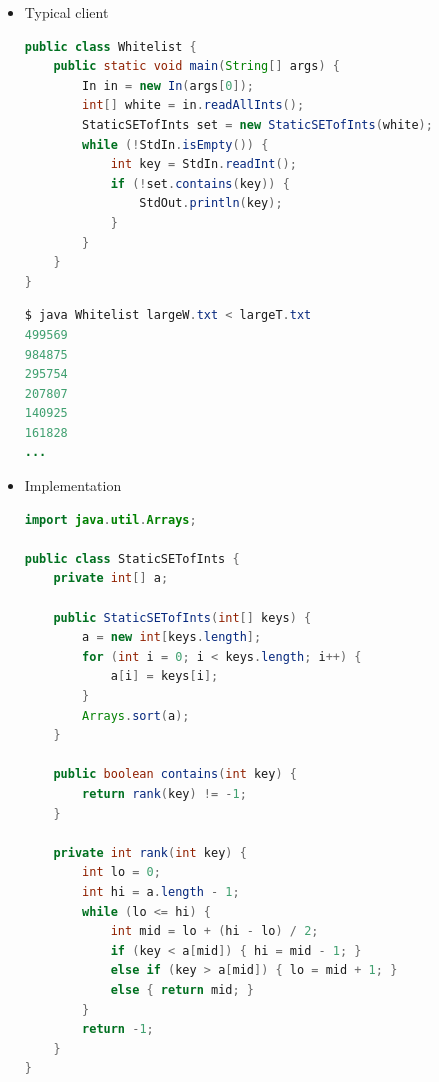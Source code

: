 \documentclass[8pt,a4paper,compress]{beamer}
\begin{document}
\begin{frame}[fragile]
\pause

\begin{itemize}
\item Typical client
\begin{lstlisting}[language=Java]
public class Whitelist {
    public static void main(String[] args) {
        In in = new In(args[0]);
        int[] white = in.readAllInts();
        StaticSETofInts set = new StaticSETofInts(white);
        while (!StdIn.isEmpty()) {
            int key = StdIn.readInt();
            if (!set.contains(key)) {
                StdOut.println(key);
            }
        }
    }
}
\end{lstlisting}

\pause

\begin{lstlisting}[language=Java]
$ java Whitelist largeW.txt < largeT.txt
499569
984875
295754
207807
140925
161828
...
\end{lstlisting}

\end{itemize}
\end{frame}

\begin{frame}[fragile]
\pause

\begin{itemize}
\item Implementation
\begin{lstlisting}[language=Java]
import java.util.Arrays;

public class StaticSETofInts {
    private int[] a;
   
    public StaticSETofInts(int[] keys) {
        a = new int[keys.length];
        for (int i = 0; i < keys.length; i++) {
            a[i] = keys[i]; 
        }
        Arrays.sort(a);
    }
    
    public boolean contains(int key) { 
        return rank(key) != -1; 
    }

    private int rank(int key) { 
        int lo = 0;
        int hi = a.length - 1;
        while (lo <= hi) { 
            int mid = lo + (hi - lo) / 2;
            if (key < a[mid]) { hi = mid - 1; }
            else if (key > a[mid]) { lo = mid + 1; }
            else { return mid; }
        }
        return -1;
    }
}
\end{lstlisting}
\end{itemize}
\end{frame}
\end{document}
